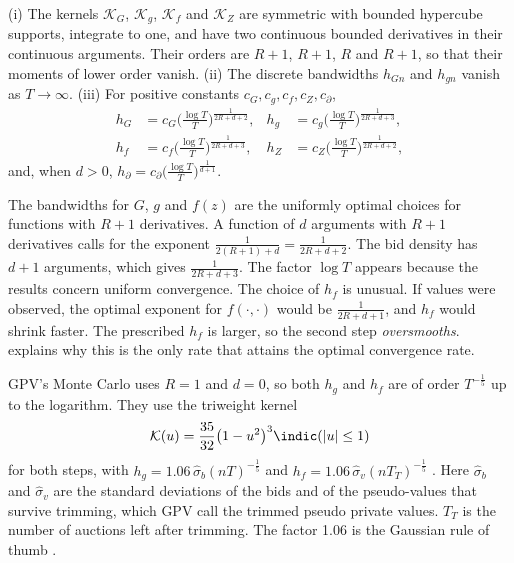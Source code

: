 \begin{assumption}\label{ass:15-gpv-bandwidth}
(i) The kernels $\mathcal K_G$, $\mathcal K_g$, $\mathcal K_f$ and $\mathcal K_Z$ are symmetric with bounded hypercube supports, integrate to one, and have two continuous bounded derivatives in their continuous arguments. Their orders are $R+1$, $R+1$, $R$ and $R+1$, so that their moments of lower order vanish.
(ii) The discrete bandwidths $h_{Gn}$ and $h_{gn}$ vanish as $T\to\infty$.
(iii) For positive constants $c_G,c_g,c_f,c_Z,c_\partial$,
\begin{align*}
h_G&=c_G\Big(\frac{\log T}{T}\Big)^{\frac{1}{2R+d+2}}, & h_g&=c_g\Big(\frac{\log T}{T}\Big)^{\frac{1}{2R+d+3}},\\
h_f&=c_f\Big(\frac{\log T}{T}\Big)^{\frac{1}{2R+d+3}}, & h_Z&=c_Z\Big(\frac{\log T}{T}\Big)^{\frac{1}{2R+d+2}},
\end{align*}
and, when $d>0$, $h_\partial=c_\partial\big(\frac{\log T}{T}\big)^{\frac{1}{d+1}}$.
\end{assumption}

The bandwidths for $G$, $g$ and $f(z)$ are the uniformly optimal choices for functions with $R+1$ derivatives. A function of $d$ arguments with $R+1$ derivatives calls for the exponent $\frac{1}{2(R+1)+d}=\frac{1}{2R+d+2}$. The bid density has $d+1$ arguments, which gives $\frac{1}{2R+d+3}$. The factor $\log T$ appears because the results concern uniform convergence. The choice of $h_f$ is unusual. If values were observed, the optimal exponent for $f(\cdot,\cdot)$ would be $\frac{1}{2R+d+1}$, and $h_f$ would shrink faster. The prescribed $h_f$ is larger, so the second step \emph{oversmooths}.  explains why this is the only rate that attains the optimal convergence rate.

 GPV's Monte Carlo uses $R=1$ and $d=0$, so both $h_g$ and $h_f$ are of order $T^{-\frac15}$ up to the logarithm. They use the triweight kernel
\[
\mathcal K(u)=\frac{35}{32}\big(1-u^2\big)^3\indic(|u|\le1)
\]
for both steps, with $h_g=1.06\,\hat\sigma_b(nT)^{-\frac15}$ and $h_f=1.06\,\hat\sigma_v(nT_T)^{-\frac15}$ \citep[p.~532]{GuerrePerrigneVuong2000}. Here $\hat\sigma_b$ and $\hat\sigma_v$ are the standard deviations of the bids and of the pseudo-values that survive trimming, which GPV call the trimmed pseudo private values. $T_T$ is the number of auctions left after trimming. The factor 1.06 is the Gaussian rule of thumb \citep{Hardle1991}.

